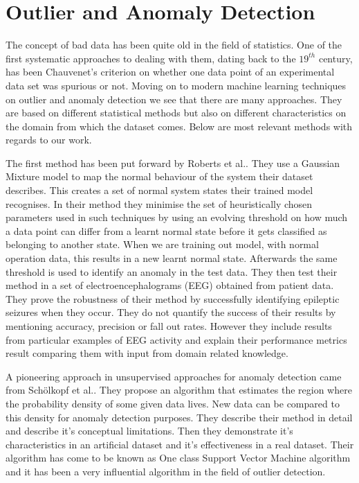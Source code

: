 \documentclass[reqno,openany,12pt]{amsbook}
\begin{document}
\section{Outlier and Anomaly Detection}

The concept of bad data has been quite old in the field of statistics. One of the first systematic approaches to dealing with them, dating back to the $19^{th}$ century, has been Chauvenet's criterion on  whether one data point of an experimental data set was spurious or not. Moving on to modern machine learning techniques on outlier and anomaly detection we see that there are many approaches. They are based on different statistical methods but also on different characteristics on the domain from which the dataset comes. Below are most relevant methods with regards to our work.

The first method has been put forward by Roberts et al.\cite{out1}. 
They use a Gaussian Mixture model to map the normal behaviour of the system their dataset describes. This creates a set of normal system states their trained model recognises. In their method they minimise the set of heuristically chosen parameters used in such techniques by using an evolving threshold on how much a data point can differ from a learnt normal state before it gets classified as belonging to another state. When we are training out model, with normal operation data, this results in a new learnt normal state. Afterwards the same threshold is used to identify an anomaly in the test data. They then test their method in a set of electroencephalograms (EEG) obtained from patient data. They prove the robustness of their method by successfully identifying epileptic seizures 
when they occur. They do not quantify the success of their results by mentioning accuracy, precision or fall out rates. However they include results from particular examples of EEG activity and explain their performance metrics result comparing them with input from domain related knowledge.


A pioneering approach in unsupervised approaches for anomaly detection came from Schölkopf et al.\cite{out4}. They propose an algorithm that estimates the region where the probability density of some given data lives. New data can be compared to this density for anomaly detection purposes. They describe their method in detail and describe it's conceptual limitations. Then they demonstrate it's characteristics in an artificial dataset and it's effectiveness in a real dataset. Their algorithm has come to be known as One class Support Vector Machine algorithm and it has been a very influential algorithm in the field of outlier detection.
\end{document}

